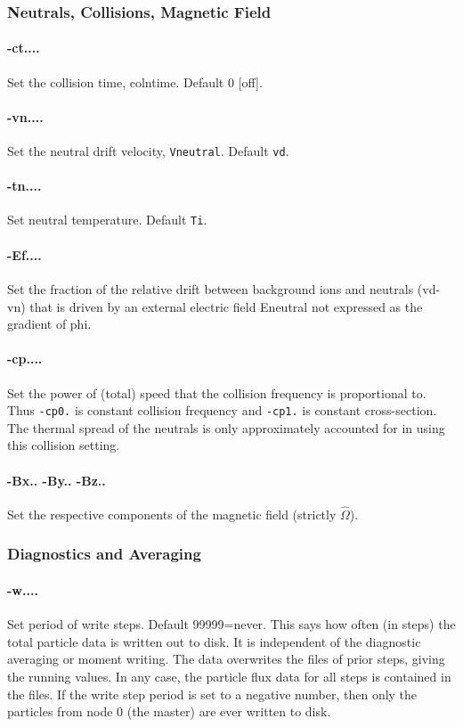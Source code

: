 \documentclass[12pt]{article}
\begin{document}
\subsubsection*{Neutrals, Collisions, Magnetic Field}

\paragraph{-ct....} Set the collision time, colntime. Default 0 [off].

\paragraph{-vn....} Set the neutral drift velocity, \verb!Vneutral!. Default \verb!vd!.

\paragraph{-tn....} Set neutral temperature. Default \verb!Ti!. 

\paragraph{-Ef....} Set the fraction of the relative drift between
background ions and neutrals (vd-vn) that is driven by an external
electric field Eneutral not expressed as the gradient of phi.

\paragraph{-cp....} Set the power of (total) speed that the
collision frequency is proportional to. Thus \verb!-cp0.! is constant
collision frequency and \verb!-cp1.! is constant cross-section. The
thermal spread of the neutrals is only approximately accounted for in
using this collision setting.


\paragraph{-Bx.. -By.. -Bz..} Set the respective components of the
magnetic field (strictly $\hat\Omega$). 

\subsubsection*{Diagnostics and Averaging}

\paragraph{-w....}  Set period of write steps. Default 99999=never.
This says how often (in steps) the total particle data is written out to
disk. It is independent of the diagnostic averaging or moment writing.
The data overwrites the files of prior steps, giving the running
values. In any case, the particle flux data for all steps is contained in
the files. If the write step period is set to a negative number, then
only the particles from node 0 (the master) are ever
written to disk. 
\end{document}
